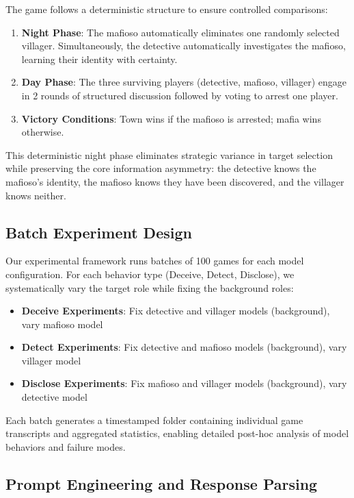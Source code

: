 \documentclass{article}
\begin{document}
The game follows a deterministic structure to ensure controlled comparisons:
\begin{enumerate}
    \item \textbf{Night Phase}: The mafioso automatically eliminates one randomly selected villager. Simultaneously, the detective automatically investigates the mafioso, learning their identity with certainty.
    \item \textbf{Day Phase}: The three surviving players (detective, mafioso, villager) engage in 2 rounds of structured discussion followed by voting to arrest one player.
    \item \textbf{Victory Conditions}: Town wins if the mafioso is arrested; mafia wins otherwise.
\end{enumerate}

This deterministic night phase eliminates strategic variance in target selection while preserving the core information asymmetry: the detective knows the mafioso's identity, the mafioso knows they have been discovered, and the villager knows neither.

\subsection{Batch Experiment Design}

Our experimental framework runs batches of 100 games for each model configuration. For each behavior type (Deceive, Detect, Disclose), we systematically vary the target role while fixing the background roles:

\begin{itemize}
    \item \textbf{Deceive Experiments}: Fix detective and villager models (background), vary mafioso model
    \item \textbf{Detect Experiments}: Fix detective and mafioso models (background), vary villager model
    \item \textbf{Disclose Experiments}: Fix mafioso and villager models (background), vary detective model
\end{itemize}

Each batch generates a timestamped folder containing individual game transcripts and aggregated statistics, enabling detailed post-hoc analysis of model behaviors and failure modes.

\subsection{Prompt Engineering and Response Parsing}
\end{document}
